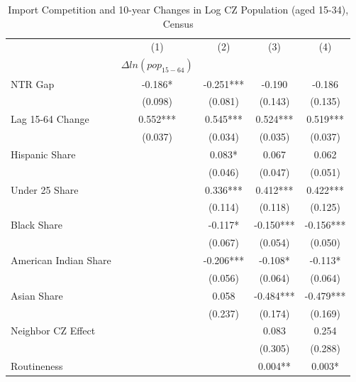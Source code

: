 \documentclass[12pt, final]{CSP}
\begin{document}
\begin{table}[htbp]\centering
\def\sym#1{\ifmmode^{#1}\else\(^{#1}\)\fi}
\caption{Import Competition and 10-year Changes in Log CZ Population (aged 15-34), Census}
\begin{tabular}{l*{4}{c}}
\hline
\hline 
\toprule
                    &\multicolumn{1}{c}{(1)}&\multicolumn{1}{c}{(2)}&\multicolumn{1}{c}{(3)}&\multicolumn{1}{c}{(4)}\\
                    &\multicolumn{1}{c}{$\Delta ln(pop_{15-64})$}&\multicolumn{1}{c}{}&\multicolumn{1}{c}{}&\multicolumn{1}{c}{}\\
\hline
\midrule
NTR Gap             &   -0.186*  &   -0.251***&   -0.190   &   -0.186   \\
                    &  (0.098)   &  (0.081)   &  (0.143)   &  (0.135)   \\
\addlinespace
Lag 15-64 Change    &    0.552***&    0.545***&    0.524***&    0.519***\\
                    &  (0.037)   &  (0.034)   &  (0.035)   &  (0.037)   \\
\addlinespace
Hispanic Share      &            &    0.083*  &    0.067   &    0.062   \\
                    &            &  (0.046)   &  (0.047)   &  (0.051)   \\
\addlinespace
Under 25 Share      &            &    0.336***&    0.412***&    0.422***\\
                    &            &  (0.114)   &  (0.118)   &  (0.125)   \\
\addlinespace
Black Share         &            &   -0.117*  &   -0.150***&   -0.156***\\
                    &            &  (0.067)   &  (0.054)   &  (0.050)   \\
\addlinespace
American Indian Share&            &   -0.206***&   -0.108*  &   -0.113*  \\
                    &            &  (0.056)   &  (0.064)   &  (0.064)   \\
\addlinespace
Asian Share         &            &    0.058   &   -0.484***&   -0.479***\\
                    &            &  (0.237)   &  (0.174)   &  (0.169)   \\
\addlinespace
Neighbor CZ Effect  &            &            &    0.083   &    0.254   \\
                    &            &            &  (0.305)   &  (0.288)   \\
\addlinespace
Routineness         &            &            &    0.004** &    0.003*  \\

\end{tabular}
\end{table}
\end{document}
